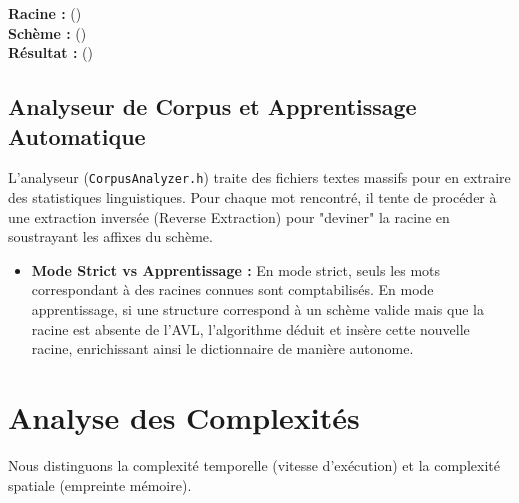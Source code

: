 \documentclass[12pt,a4paper]{article}
\begin{document}
\begin{tcolorbox}[title=Exemple de Génération Morphologique]
	\textbf{Racine :} () \\
	\textbf{Schème :} () \\
	\textbf{Résultat :} ()
\end{tcolorbox}

\subsection{Analyseur de Corpus et Apprentissage Automatique}
L'analyseur (\texttt{CorpusAnalyzer.h}) traite des fichiers textes massifs pour en extraire des statistiques linguistiques. Pour chaque mot rencontré, il tente de procéder à une extraction inversée (Reverse Extraction) pour "deviner" la racine en soustrayant les affixes du schème.
\begin{itemize}[label=\textbullet, itemsep=2pt]
	\item \textbf{Mode Strict vs Apprentissage :} En mode strict, seuls les mots correspondant à des racines connues sont comptabilisés. En mode apprentissage, si une structure correspond à un schème valide mais que la racine est absente de l'AVL, l'algorithme déduit et insère cette nouvelle racine, enrichissant ainsi le dictionnaire de manière autonome.
\end{itemize}

\section{Analyse des Complexités}

Nous distinguons la complexité temporelle (vitesse d'exécution) et la complexité spatiale (empreinte mémoire).
\end{document}
